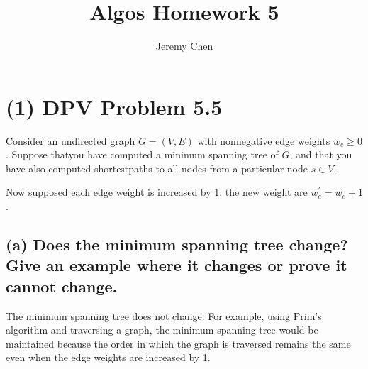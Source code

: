 \documentclass[10pt,letterpaper]{article}
\title{Algos Homework 5}
\author{Jeremy Chen}
\begin{document}
	\maketitle
\section*{(1) DPV Problem 5.5}
\noindent Consider an undirected graph $G = (V, E)$ with nonnegative edge weights $w_{e} \geq 0$. Suppose thatyou have computed a minimum spanning tree of $G$, and that you have also computed shortestpaths to all nodes from a particular node $s \in V$. 

\noindent Now supposed each edge weight is increased by 1: the new weight are $w_{e}^{'} = w_{e} + 1$.
\subsection*{(a) Does the minimum spanning tree change? Give an example where it changes or prove it cannot change.}
The minimum spanning tree does not change. For example, using Prim's algorithm and traversing a graph, the minimum spanning tree would be maintained because the order in which the graph is traversed remains the same even when the edge weights are increased by 1. 
\begin{figure}[h!]
\centering
{}
\end{figure}
\begin{figure}[h!]
\centering
{}
\hfill
{}
\end{figure}
\end{document}
